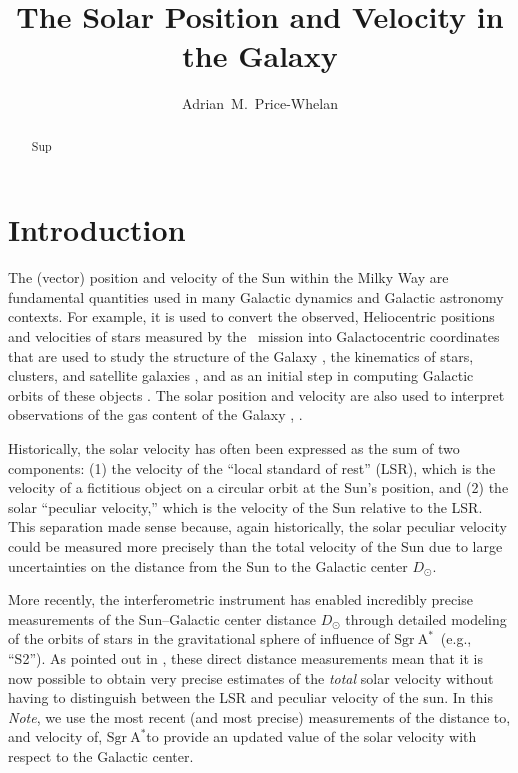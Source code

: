 \documentclass[modern]{aastex631}
\newcommand{\sgrA}{\ensuremath{\textrm{Sgr}~\textrm{A}^{*}}}
\begin{document}
\title{The Solar Position and Velocity in the Galaxy}

\author[0000-0003-0872-7098]{Adrian~M.~Price-Whelan}



\begin{abstract}\noindent
Sup
\end{abstract}

\section{Introduction} \label{sec:intro}

The (vector) position and velocity of the Sun within the Milky Way are
fundamental quantities used in many Galactic dynamics and Galactic astronomy
contexts.
For example, it is used to convert the observed, Heliocentric positions and
velocities of stars measured by the \gaia\ mission into Galactocentric
coordinates that are used to study the structure of the Galaxy
\cite[e.g.,][]{todo}, the kinematics of stars, clusters, and satellite galaxies
\cite[e.g.,][]{todo}, and as an initial step in computing Galactic orbits of
these objects \citep[e.g.,][]{}.
The solar position and velocity are also used to interpret observations of the
gas content of the Galaxy \citep{todo}, .

Historically, the solar velocity has often been expressed as the sum of two
components: (1) the velocity of the ``local standard of rest'' (LSR), which is
the velocity of a fictitious object on a circular orbit at the Sun's position,
and (2) the solar ``peculiar velocity,'' which is the velocity of the Sun
relative to the LSR.
This separation made sense because, again historically, the solar peculiar
velocity could be measured more precisely than the total velocity of the Sun due
to large uncertainties on the distance from the Sun to the Galactic center
$D_\odot$.

More recently, the interferometric  instrument has enabled
incredibly precise measurements of the Sun--Galactic center distance $D_\odot$
through detailed modeling of the orbits of stars in the gravitational sphere of
influence of \sgrA\ (e.g., ``S2'').
As pointed out in \citet{Drimmel:2018}, these direct distance measurements mean
that it is now possible to obtain very precise estimates of the \emph{total}
solar velocity without having to distinguish between the LSR and peculiar
velocity of the sun.
In this \textit{Note}, we use the most recent (and most precise)
 measurements of the distance to, and velocity of, \sgrA to
provide an updated value of the solar velocity with respect to the Galactic
center.
\end{document}
